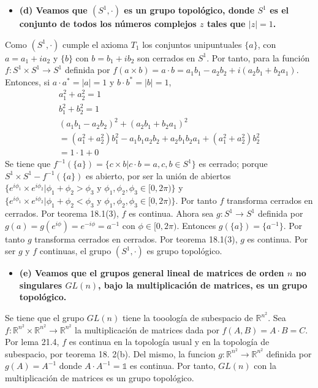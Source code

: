 \documentclass{article}
\begin{document}
\begin{itemize}
\item \bf (d) \rm Veamos que $(S^1,\cdot)$ es un grupo topológico, donde $S^1$ es el conjunto de todos los números complejos $z$ tales que $|z|=1$.
\end{itemize}
Como $(S^1,\cdot)$ cumple el axioma $T_1$ los conjuntos unipuntuales $\{a\}$, con $a=a_1+ia_2$ y $\{b\}$ con $b=b_1+ib_2$ son cerrados en $S^1$. Por tanto, para la función $f:S^1\times S^1\rightarrow S^1$ definida por $f(a\times b)=a\cdot b=a_1b_1-a_2b_2+i(a_2b_1+b_2a_1)$. Entonces, si $a\cdot a^*=|a|=1$ y $b\cdot b^*=|b|=1$, 
\begin{eqnarray}
a_1^2+a_2^2=1\nonumber\\
b_1^2+b^2_2=1\nonumber\\
(a_1b_1-a_2b_2)^2+(a_2b_1+b_2a_1)^2\nonumber\\
=(a_1^2+a_2^2)b_1^2-a_1b_1a_2b_2+a_2b_1b_2a_1+(a_1^2+a_2^2)b_2^2\nonumber\\
=1\cdot 1+0\nonumber
\end{eqnarray}
Se tiene que $f^{-1}(\{a\})=\{c\times b|c\cdot b=a,c,b\in S^1\}$ es cerrado; porque $S^1\times S^1-f^{-1}(\{a\})$ es abierto, por ser la unión de abiertos $\{e^{i\phi_1}\times e^{i\phi_2}|\phi_1+\phi_2 >\phi_3 \text{ y }\phi_1,\phi_2,\phi_3\in [0,2\pi)\}$ y $\{e^{i\phi_1}\times e^{i\phi_2}|\phi_1+\phi_2 <\phi_3 \text{ y }\phi_1,\phi_2,\phi_3\in [0,2\pi)\}$. Por tanto $f$ transforma cerrados en cerrados. Por teorema 18.1(3), $f$ es continua. Ahora sea $g:S^1\rightarrow S^1$ definida por $g(a)=g(e^{i\phi})=e^{-i\phi}=a^{-1}$ con $\phi\in [0,2\pi)$. Entonces $g(\{a\})=\{a^{-1}\}$. Por tanto $g$ transforma cerrados en cerrados. Por teorema 18.1(3), $g$ es continua. Por ser $g$ y $f$ continuas, el grupo $(S^1,\cdot)$ es grupo topológico.
\begin{itemize}
\item \bf (e) \rm Veamos que el grupos general lineal de matrices de orden $n$ no singulares $GL(n)$, bajo la multiplicación de matrices, es un grupo topológico.
\end{itemize}
Se tiene que el grupo $GL(n)$ tiene la tooología de subespacio de $\mathbb{R}^{n^2}$. Sea $f:\mathbb{R}^{n^2}\times \mathbb{R}^{n^2}\rightarrow\mathbb{R}^{n^2}$ la multiplicación de matrices dada por $f(A,B)=A\cdot B =C$. Por lema 21.4, $f$ es continua en la topología usual y en la topología de subespacio, por teorema 18. 2(b). Del mismo, la funcion $g:\mathbb{R}^{n^2}\rightarrow\mathbb{R}^{n^2}$ definida por $g(A)=A^{-1}$ donde $A\cdot A^{-1}=\mathbb{1}$ es continua.
Por tanto, $GL(n)$ con la multiplicación de matrices es un grupo topológico.
\end{document}
